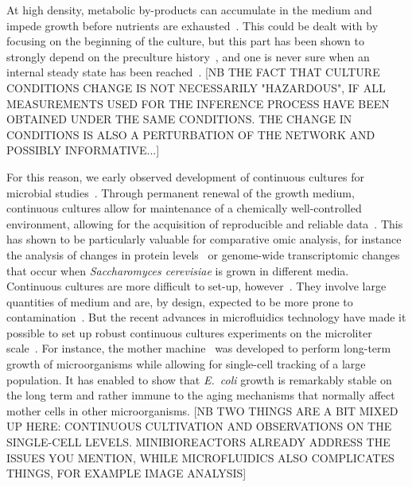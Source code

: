 At high density, metabolic by-products can accumulate in the medium and impede growth before nutrients are exhausted~\cite{ackerman_accumulation_1974,lenski_chemical_2002,luli_comparison_1990}.
This could be dealt with by focusing on the beginning of the culture, but this part has been shown to strongly depend on the preculture history~\cite{ng_damage_1962,dufrenne_effect_1997,shaw_effect_1967}, and one is never sure when an internal steady state has been reached~\cite{myers_culture_1944}. [NB THE FACT THAT CULTURE CONDITIONS CHANGE IS NOT NECESSARILY "HAZARDOUS", IF ALL MEASUREMENTS USED FOR THE INFERENCE PROCESS HAVE BEEN OBTAINED UNDER THE SAME CONDITIONS. THE CHANGE IN CONDITIONS IS ALSO A PERTURBATION OF THE NETWORK AND POSSIBLY INFORMATIVE...]

For this reason, we early observed development of continuous cultures for microbial studies~\cite{myers_culture_1944,novick_experiments_1950,herbert_continuous_1956}.
Through permanent renewal of the growth medium, continuous cultures allow for maintenance of a chemically well-controlled environment, allowing for the acquisition of reproducible and reliable data~\cite{borirak_molecular_2014,hoskisson_continuous_2005}.
This has shown to be particularly valuable for comparative omic analysis, for instance the analysis of changes in protein levels~\cite{kolkman_comparative_2005} or genome-wide transcriptomic changes~\cite{boer_genome-wide_2003} that occur when \textit{Saccharomyces cerevisiae} is grown in different media.
Continuous cultures are more difficult to set-up, however~\cite{novick_experiments_1950,borirak_molecular_2014}.
They involve large quantities of medium and are, by design, expected to be more prone to contamination~\cite{novick_experiments_1950}.
But the recent advances in microfluidics technology have made it possible to set up robust continuous cultures experiments on the microliter scale~\cite{wang_robust_2010,balaban_bacterial_2004}.
For instance, the mother machine~\cite{wang_robust_2010} was developed to perform long-term growth of microorganisms while allowing for single-cell tracking of a large population.
It has enabled to show that \textit{E.~coli} growth is remarkably stable on the long term and rather immune to the aging mechanisms that normally affect mother cells in other microorganisms.
[NB TWO THINGS ARE A BIT MIXED UP HERE: CONTINUOUS CULTIVATION AND OBSERVATIONS ON THE SINGLE-CELL LEVELS. MINIBIOREACTORS ALREADY ADDRESS THE ISSUES YOU MENTION, WHILE MICROFLUIDICS ALSO COMPLICATES THINGS, FOR EXAMPLE IMAGE ANALYSIS]

